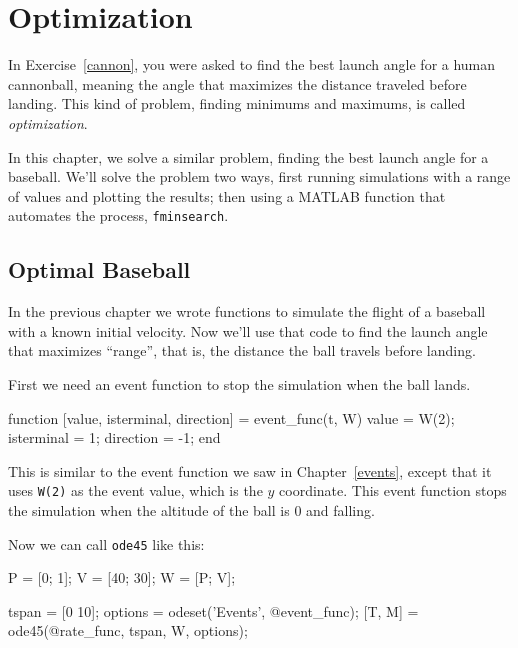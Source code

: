 \chapter{Optimization}

In Exercise~\ref{cannon}, you were asked to find the best launch angle for a human cannonball, meaning the angle that maximizes the distance traveled before landing.  This kind of problem, finding minimums and maximums, is called {\em optimization}.

In this chapter, we solve a similar problem, finding the best launch angle for a baseball.
We'll solve the problem two ways, first running simulations with a range of values and plotting the results; then using a MATLAB function that automates the process, {\tt fminsearch}.

\section{Optimal Baseball}

In the previous chapter we wrote functions to simulate the flight of a baseball with a known initial velocity.  Now we'll use that code to find the launch angle that maximizes ``range'', that is, the distance the ball travels before landing.


First we need an event function to stop the simulation when the ball lands.

\begin{code}
function [value, isterminal, direction] = event_func(t, W)
    value = W(2);
    isterminal = 1;
    direction = -1;
end
\end{code}


This is similar to the event function we saw in Chapter~\ref{events}, except that it uses {\tt W(2)} as the event value, which is the $y$ coordinate.  This event function stops the simulation when the altitude of the ball is 0 and falling.

Now we can call {\tt ode45} like this:

\begin{code}
    P = [0; 1];       %
    V = [40; 30];     %
    W = [P; V];       %
    
    tspan = [0 10];
    options = odeset('Events', @event_func);
    [T, M] = ode45(@rate_func, tspan, W, options);
\end{code}

